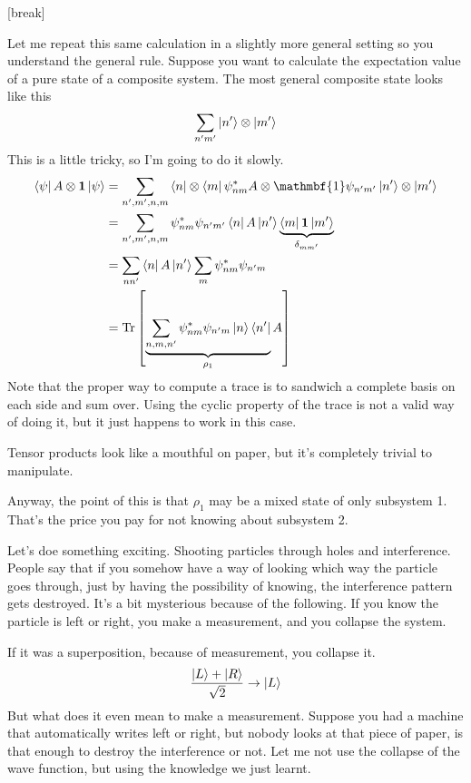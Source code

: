 [break]

Let me repeat this same calculation in a slightly more general setting so you
understand the general rule.
Suppose you want to calculate the expectation value of a pure state of a
composite system.
The most general composite state looks like this
\begin{align}
    \sum_{n'm'}\ket{n'}\otimes\ket{m'}
\end{align}
This is a little tricky,
so I'm going to do it slowly.
\begin{align}
    \bra{\psi}A\otimes\mathbf{1}\ket{\psi}
    &=
    \sum_{n',m',n,m}
    \bra{n}\otimes\bra{m}
    \psi_{nm}^*
    A\otimes\mathmbf{1}
    \psi_{n'm'}\ket{n'}\otimes\ket{m'}\\
    &=
    \sum_{n',m',n,m}
    \psi_{nm}^* \psi_{n'm'}
    \bra{n}A\ket{n'}
    \underbrace{\bra{m}\mathbf{1}\ket{m'}}_{\delta_{mm'}}\\
    &=
    \sum_{nn'}\bra{n}A\ket{n'}
    \sum_m\psi_{nm}^* \psi_{n'm}\\
    &= \Tr\left[
        \underbrace{\sum_{n,m,n'} \psi_{nm}^* \psi_{n'm}\ket{n}\bra{n'}}_{%
            \rho_1
        }
        A
    \right]
\end{align}
Note that the proper way to compute a trace is to sandwich a complete basis on
each side and sum over.
Using the cyclic property of the trace is not a valid way of doing it,
but it just happens to work in this case.

Tensor products look like a mouthful on paper,
but it's completely trivial to manipulate.

Anyway,
the point of this is that $\rho_1$ may be a mixed state of only subsystem 1.
That's the price you pay for not knowing about subsystem 2.


Let's doe something exciting.
Shooting particles through holes and interference.
People say that if you somehow have a way of looking which way the particle goes
through,
just by having the possibility of knowing,
the interference pattern gets destroyed.
It's a bit mysterious because of the following.
If you know the particle is left or right,
you make a measurement,
and you collapse the system.

If it was a superposition,
because of measurement,
you collapse it.
\begin{align}
    \frac{\ket{L} + \ket{R}}{\sqrt{2}}
    \to
    \ket{L}
\end{align}
But what does it even mean to make a measurement.
Suppose you had a machine that automatically writes left or right,
but nobody looks at that piece of paper,
is that enough to destroy the interference or not.
Let me not use the collapse of the wave function,
but using the knowledge we just learnt.


